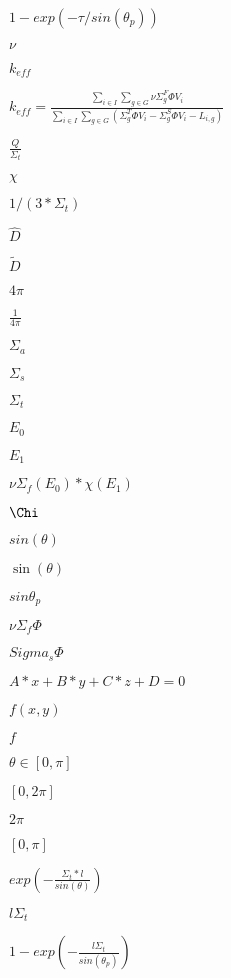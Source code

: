 \documentclass{article}
\begin{document}
$ 1 - exp(-\tau/sin(\theta_p)) $
\pagebreak

$ \nu $
\pagebreak

$ k_{eff} $
\pagebreak

$ k_{eff} = \frac{\displaystyle\sum_{i \in I} \displaystyle\sum_{g \in G} \nu \Sigma^F_g \Phi V_{i}} {\displaystyle\sum_{i \in I} \displaystyle\sum_{g \in G} (\Sigma^T_g \Phi V_{i} - \Sigma^S_g \Phi V_{i} - L_{i,g})} $
\pagebreak

$ \frac{Q}{\Sigma_t} $
\pagebreak

$ \chi $
\pagebreak

$1 / (3 * \Sigma_t)$
\pagebreak

$ \hat{D} $
\pagebreak

$ \tilde{D} $
\pagebreak

$ 4\pi $
\pagebreak

$ \frac{1}{4\pi} $
\pagebreak

$ \Sigma_a $
\pagebreak

$ \Sigma_s $
\pagebreak

$ \Sigma_t $
\pagebreak

$ E_{0} $
\pagebreak

$ E_{1} $
\pagebreak

$ \nu\Sigma_{f}(E_{0}) * \chi(E_{1})$
\pagebreak

$ \Chi $
\pagebreak

$ sin(\theta)$
\pagebreak

$ \sin(\theta) $
\pagebreak

$ sin\theta_{p} $
\pagebreak

$ \nu\Sigma_f\Phi $
\pagebreak

$ Sigma_s\Phi $
\pagebreak

$ A * x + B * y + C * z + D = 0 $
\pagebreak

$ f(x,y) $
\pagebreak

$f$
\pagebreak

$ \theta \in [0, \pi] $
\pagebreak

$ [0, 2\pi] $
\pagebreak

$ 2\pi $
\pagebreak

$ [0, \pi] $
\pagebreak

$ exp(-\frac{\Sigma_t * l}{sin(\theta)}) $
\pagebreak

$ l\Sigma_t $
\pagebreak

$ 1 - exp(-\frac{l\Sigma_t}{sin(\theta_p)}) $
\pagebreak
\end{document}

